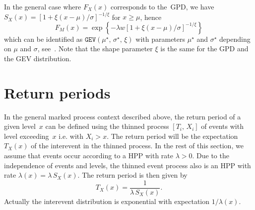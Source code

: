 \documentclass[a4paper]{report}
\begin{document}
In the general case where $F_X(x)$ corresponds to the~GPD, we have 
$S_X(x) = \left[1 + \xi (x-\mu)/\sigma \right]^{-1/\xi}$ for 
$x \geqslant \mu$, hence
$$
   F_M(x) = \exp\left\{ -\lambda w 
     \left[1 + \xi (x-\mu)/\sigma \right]^{-1/\xi} \right\}
$$
which can be identified as $\texttt{GEV}(\mu^\star,\,\sigma^\star, \,\xi)$ 
with parameters $\mu^\star$ and $\sigma^\star$ depending on $\mu$ and  $\sigma$,
see~\citet{RenCompDet}.
Note that the shape parameter $\xi$ is the same for the GPD and the 
GEV distribution.





\section{Return periods}
\label{TWORL}

In the general marked process context described above, the return
period of a given level~$x$ can be defined using the thinned process
$[T_i,\,X_i]$ of events with level exceeding~$x$ i.e. with
$X_i>x$. The return period will be the expectation $T_X(x)$ of the
interevent in the thinned process.  In the rest of this section, we
assume that events occur according to a HPP with rate $\lambda>0$. Due
to the independence of events and levels, the thinned event process
also is an HPP with rate $\lambda(x) = \lambda\,S_X(x)$. The return
period is then given by
$$
    T_X(x) = \frac{1}{\lambda \,S_X(x)}.
$$
Actually the interevent distribution is exponential with expectation $1/\lambda(x)$.
\end{document}

